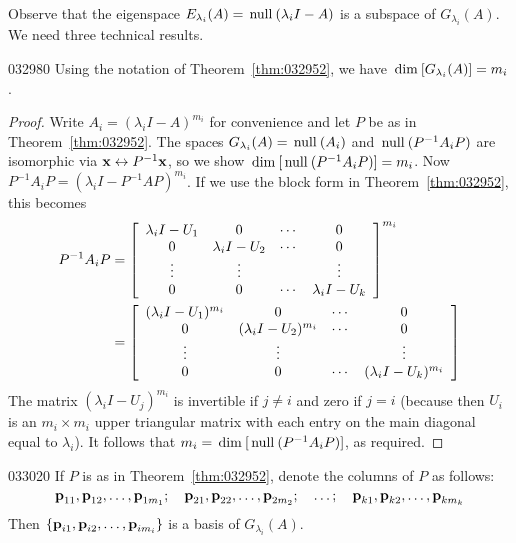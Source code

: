 \noindent Observe that the eigenspace $E_{\lambda_i}(A) = \thinspace\operatorname{null\medspace}(\lambda_{i}I - A)$ is a subspace of $G_{\lambda_i}(A)$. We need three technical results.


\begin{lemma}{}{032980}
Using the notation of Theorem~\ref{thm:032952}, we have $\thinspace\operatorname{dim\medspace}[G_{\lambda_i}(A)] = m_{i}$.
\end{lemma}

\begin{proof}
Write $A_{i} = (\lambda_{i}I - A)^{m_i}$ for convenience and let $P$ be as in Theorem~\ref{thm:032952}. The spaces \newline $G_{\lambda_i}(A) = \thinspace\operatorname{null\medspace}(A_{i})$ and $\thinspace\operatorname{null\medspace}(P^{-1}A_{i}P)$ are isomorphic via $\textbf{x} \leftrightarrow P^{-1}\textbf{x}$, so we show $\thinspace\operatorname{dim\medspace}[\thinspace\operatorname{null\medspace}(P^{-1}A_{i}P)] = m_{i}$. Now $P^{-1}A_{i}P = (\lambda_{i}I - P^{-1}AP)^{m_i}$. If we use the block form in Theorem~\ref{thm:032952}, this becomes
\begin{align*}
P^{-1}A_{i}P &= \left[ \begin{array}{cccc}
\lambda_{i}I - U_1 & 0 & \cdots & 0 \\
0 & \lambda_{i}I - U_2 & \cdots & 0 \\
\vdots & \vdots &  & \vdots \\
0 & 0 & \cdots & \lambda_{i}I - U_k
\end{array} \right]^{m_i} \\
&= \left[ \begin{array}{cccc}
(\lambda_{i}I - U_1)^{m_i} & 0 & \cdots & 0 \\
0 & (\lambda_{i}I - U_2)^{m_i} & \cdots & 0 \\
\vdots & \vdots &  & \vdots \\
0 & 0 & \cdots & (\lambda_{i}I - U_k)^{m_i}
\end{array} \right]
\end{align*}
The matrix $(\lambda_{i}I - U_{j})^{m_i}$ is invertible if $j \neq i$ and zero if $j = i$ (because then $U_{i}$ is an $m_{i} \times m_{i}$ upper triangular matrix with each entry on the main diagonal equal to $\lambda_{i}$). It follows that $m_{i} = \thinspace\operatorname{dim\medspace}[\thinspace\operatorname{null\medspace}(P^{-1}A_{i}P)]$, as required.
\end{proof}

\begin{lemma}{}{033020}
If $P$ is as in Theorem~\ref{thm:032952}, denote the columns of $P$ as follows:
\begin{equation*}
\textbf{p}_{11}, \textbf{p}_{12}, \dots, \textbf{p}_{1m_1}; \quad \textbf{p}_{21}, \textbf{p}_{22}, \dots, \textbf{p}_{2m_2}; \quad \dots; \quad \textbf{p}_{k1}, \textbf{p}_{k2}, \dots, \textbf{p}_{km_k}
\end{equation*}
Then $\{\textbf{p}_{i1}, \textbf{p}_{i2}, \dots, \textbf{p}_{im_i}\}$ is a basis of $G_{\lambda_i}(A)$.
\end{lemma}

